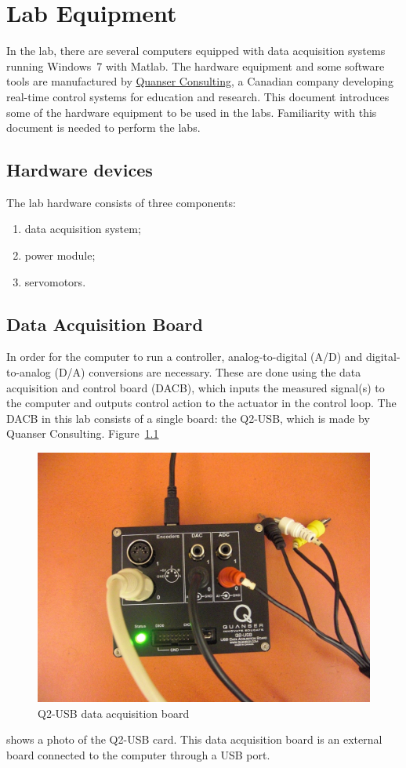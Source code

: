 \chapter{Lab Equipment}\label{chap:hardware}

In the lab, there are several computers equipped with data acquisition
systems running Windows~7 with Matlab. The hardware equipment and some
software tools are manufactured by \href{http://www.quanser.com/}{Quanser
Consulting}, a Canadian company developing real-time control systems for
education and research. This document introduces some of the hardware
equipment to be used in the labs. Familiarity with this document is needed to
perform the labs.

\section{Hardware devices}

The lab hardware consists of three components:
\begin{enumerate}
\item data acquisition system;
\item power module;
\item servomotors.
\end{enumerate}

\section{Data Acquisition Board}

In order for the computer to run a controller, analog-to-digital (A/D) and
digital-to-analog (D/A) conversions are necessary. These are done using the
data acquisition and control board (DACB), which inputs the measured
signal(s) to the computer and outputs control action to the actuator in the
control loop.  The DACB in this lab consists of a single board: the Q2-USB,
which is made by Quanser Consulting.  Figure~\ref{fig:q2usb}
\begin{figure}[htbp]
\centering
\includegraphics[width=0.6\hsize]{pix/Q2USB.jpg}
\caption{Q2-USB data acquisition board}\label{fig:q2usb}
\end{figure}%
shows a photo of the Q2-USB card. This data acquisition board is an external
board connected to the computer through a USB port.

